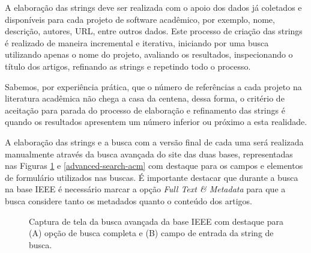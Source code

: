 A elaboração das strings deve ser realizada com o apoio dos dados já coletados
e disponíveis para cada projeto de software acadêmico, por exemplo, nome,
descrição, autores, URL, entre outros dados. Este processo de criação das
strings é realizado de maneira incremental e iterativa, iniciando por uma busca
utilizando apenas o nome do projeto, avaliando os resultados, inspecionando o
título dos artigos, refinando as strings e repetindo todo o processo.

Sabemos, por experiência prática, que o número de referências a cada projeto na
literatura acadêmica não chega a casa da centena, dessa forma, o critério de
aceitação para parada do processo de elaboração e refinamento das strings é
quando os resultados apresentem um número inferior ou próximo a esta realidade.

A elaboração das strings e a busca com a versão final de cada uma será
realizada manualmente através da busca avançada do site das duas bases,
representadas nas Figuras \ref{advanced-search-ieee} e
\ref{advanced-search-acm} com destaque para os campos e elementos de formulário
utilizados nas buscas. É importante destacar que durante a busca na
base IEEE é necessário marcar a opção {\it Full Text \& Metadata} para que a
busca considere tanto os metadados quanto o conteúdo dos artigos.

\begin{figure}[h]
  \center
  \caption{Captura de tela da busca avançada da base IEEE com destaque para (A) opção de busca completa e (B) campo de entrada da string de busca.}
  \label{advanced-search-ieee}
\end{figure}


